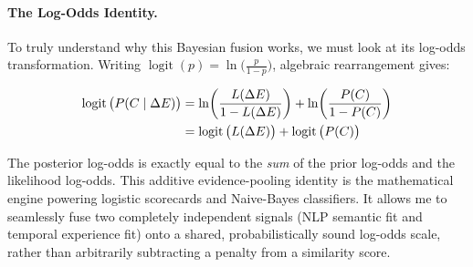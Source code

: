 \paragraph{The Log-Odds Identity.} To truly understand why this Bayesian fusion works, we must look at its log-odds transformation. Writing $\operatorname{logit}(p) = \ln\big(\tfrac{p}{1-p}\big)$, algebraic rearrangement gives:

\begin{align}
\operatorname{logit}\big(P(C \mid \Delta E)\big)
&= \ln\!\left(\frac{L(\Delta E)}{1-L(\Delta E)}\right) + \ln\!\left(\frac{P(C)}{1-P(C)}\right) \notag \\
&= \operatorname{logit}\big(L(\Delta E)\big) + \operatorname{logit}\big(P(C)\big)
\label{eq:log_odds_identity}
\end{align}

\vspace{0.5em}

The posterior log-odds is exactly equal to the \emph{sum} of the prior log-odds and the likelihood log-odds. This additive evidence-pooling identity is the mathematical engine powering logistic scorecards and Naive-Bayes classifiers. It allows me to seamlessly fuse two completely independent signals (NLP semantic fit and temporal experience fit) onto a shared, probabilistically sound log-odds scale, rather than arbitrarily subtracting a penalty from a similarity score.

